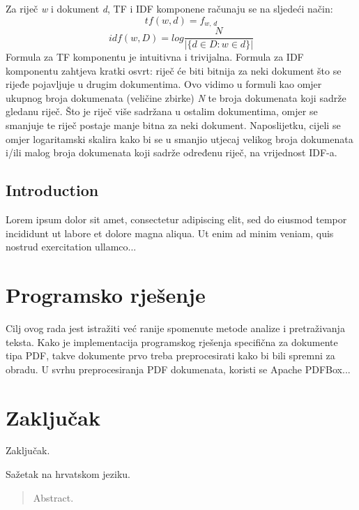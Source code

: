 \documentclass[times, utf8, zavrsni]{fer}
\begin{document}
Za riječ \textit{w} i dokument \textit{d}, TF i IDF komponene računaju se na sljedeći način:
\[ tf(w, d) = f_\textit{w, d} \]
\[ idf(w, D) = log\frac{N}{|\{d \in D:w \in d\}|} \]
Formula za TF komponentu je intuitivna i trivijalna. Formula za IDF komponentu zahtjeva kratki osvrt: riječ će biti bitnija za neki dokument što se rijeđe pojavljuje u drugim dokumentima. Ovo vidimo u formuli kao omjer ukupnog broja dokumenata (veličine zbirke) \textit{N} te broja dokumenata koji sadrže gledanu riječ. Što je riječ više sadržana u ostalim dokumentima, omjer se smanjuje te riječ postaje manje bitna za neki dokument. Naposlijetku, cijeli se omjer logaritamski skalira kako bi se u smanjio utjecaj velikog broja dokumenata i/ili malog broja dokumenata koji sadrže određenu riječ, na vrijednost IDF-a.

\section{Introduction}
Lorem ipsum dolor sit amet, consectetur adipiscing elit, sed do 
eiusmod tempor incididunt ut labore et dolore magna aliqua. Ut 
enim ad minim veniam, quis nostrud exercitation ullamco...

\chapter{Programsko rješenje}
Cilj ovog rada jest istražiti već ranije spomenute metode analize i pretraživanja teksta.	Kako je implementacija programskog rješenja specifična za dokumente tipa PDF, takve dokumente prvo treba preprocesirati kako bi bili spremni za obradu. U svrhu preprocesiranja PDF dokumenata, koristi se Apache PDFBox...

\chapter{Zaključak}
Zaključak.




\begin{sazetak}
Sažetak na hrvatskom jeziku.

\end{sazetak}

\begin{abstract}
Abstract.

\end{abstract}
\end{document}

